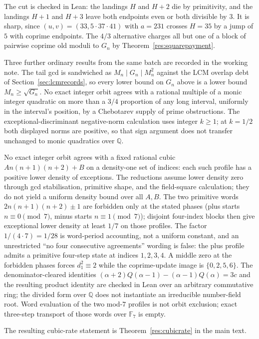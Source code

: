 The cut is checked in Lean: the landings $H$ and $H+2$ die by primitivity, and
the landings $H+1$ and $H+3$ leave both endpoints even or both divisible by
$3$.  It is sharp, since $(u,v)=(33,5\cdot37\cdot41)$ with $a=231$ crosses
$H=35$ by a jump of $5$ with coprime endpoints.  The $4/3$ alternative charges
all but one of a block of pairwise coprime old moduli to $G_n$ by
Theorem~\ref{res:squarepayment}.

Three further ordinary results from the same batch are recorded in the working
note.  The tail gcd is sandwiched as $M_n\mid G_n\mid M_n^2$ against the LCM
overlap debt of Section~\ref{sec:lcmrecords}, so every lower bound on $G_n$
above is a lower bound $M_n\ge\sqrt{G_n}$.  No exact integer orbit agrees with a
rational multiple of a monic integer quadratic on more than a $3/4$ proportion
of any long interval, uniformly in the interval's position, by a Chebotarev
supply of prime obstructions.  The exceptional-discriminant negative-norm
calculation uses integer $k\ge1$; at $k=1/2$ both displayed norms are positive,
so that sign argument does not transfer unchanged to monic quadratics over
$\mathbb Q$.

No exact integer orbit agrees with a fixed rational cubic
$An(n+1)(n+2)+B$ on a density-one set of indices: each such profile has a
positive lower density of exceptions.  The reductions assume lower density
zero through gcd stabilisation, primitive shape, and the field-square
calculation; they do not yield a uniform density bound over all $A,B$.  The
two primitive words $2n(n+1)(n+2)\pm1$ are forbidden only at the stated
phases (plus starts $n\equiv0\pmod7$, minus starts $n\equiv1\pmod7$); disjoint
four-index blocks then give exceptional lower density at least $1/7$ on those
profiles.  The factor $1/(4\cdot7)=1/28$ is word-period accounting, not a uniform
constant, and an unrestricted ``no four consecutive agreements'' wording is
false: the plus profile admits a primitive four-step state at indices
$1,2,3,4$.  A middle zero at the forbidden phases forces $d_1^2\equiv2$ while
the coprime-update image is $\{0,2,5,6\}$.  The denominator-cleared identities
$(\alpha+2)Q(\alpha-1)-(\alpha-1)Q(\alpha)=3c$ and the resulting product identity
are checked in Lean over an arbitrary commutative ring; the divided form over
$\mathbb Q$ does not instantiate an irreducible number-field root.  Word
evaluation of the two mod-$7$ profiles is not orbit exclusion; exact three-step
transport of those words over $\mathbb F_7$ is empty.

The resulting cubic-rate statement is Theorem~\ref{res:cubicrate}
in the main text.

